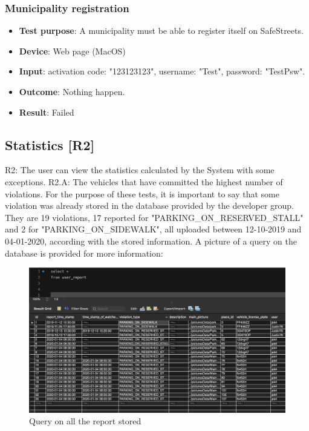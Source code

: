 \documentclass[../ATD.tex]{subfiles}
\begin{document}
    \subsubsection{Municipality registration}\label{subsubsec:municipality-registration}
    \begin{itemize}
        \item \textbf{Test purpose}: A municipality must be able to register itself on SafeStreets.
        \item \textbf{Device}: Web page (MacOS)
        \item \textbf{Input}: activation code: "123123123", username: "Test", password: "TestPsw".
        \item \textbf{Outcome}: Nothing happen.
        \item \textbf{Result}: Failed
    \end{itemize}

    \subsection{Statistics [R2]}\label{subsec:statistics}
    R2: The user can view the statistics calculated by the System with some exceptions.
    \newline
    R2.A: The vehicles that have committed the highest number of violations.
    \newline
    For the purpose of these tests, it is important to say that some violation was already stored in the database provided by the developer group.
    They are 19 violations, 17 reported for "PARKING_ON_RESERVED_STALL" and 2 for "PARKING_ON_SIDEWALK", all uploaded between 12-10-2019 and 04-01-2020, according with the stored information.
    A picture of a query on the database is provided for more information:
    \begin{figure}[H]
        \centering
        \includegraphics{../assets/database_user_report.png}
        \caption{Query on all the report stored}
    \end{figure}
\end{document}

